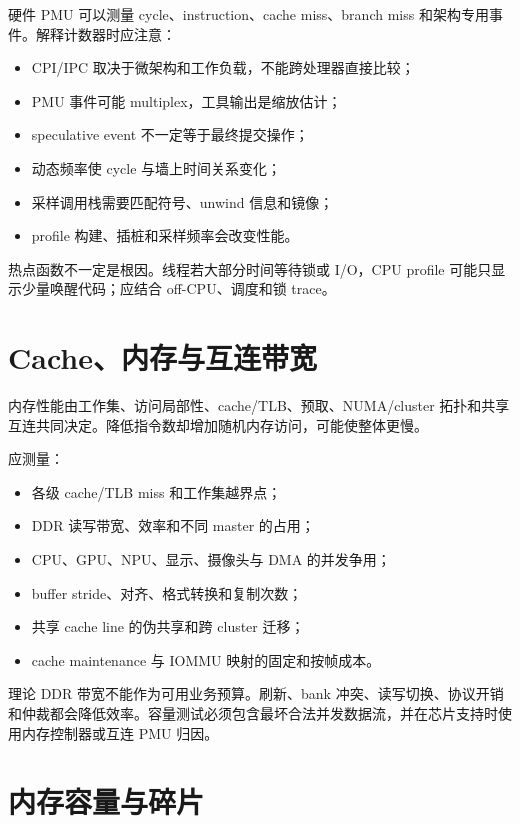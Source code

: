 硬件 PMU 可以测量 cycle、instruction、cache miss、branch miss 和架构专用事件。解释计数器时应注意：

\begin{itemize}
  \item CPI/IPC 取决于微架构和工作负载，不能跨处理器直接比较；
  \item PMU 事件可能 multiplex，工具输出是缩放估计；
  \item speculative event 不一定等于最终提交操作；
  \item 动态频率使 cycle 与墙上时间关系变化；
  \item 采样调用栈需要匹配符号、unwind 信息和镜像；
  \item profile 构建、插桩和采样频率会改变性能。
\end{itemize}

热点函数不一定是根因。线程若大部分时间等待锁或 I/O，CPU profile 可能只显示少量唤醒代码；应结合 off-CPU、调度和锁 trace。

\section{Cache、内存与互连带宽}

内存性能由工作集、访问局部性、cache/TLB、预取、NUMA/cluster 拓扑和共享互连共同决定。降低指令数却增加随机内存访问，可能使整体更慢。

应测量：

\begin{itemize}
  \item 各级 cache/TLB miss 和工作集越界点；
  \item DDR 读写带宽、效率和不同 master 的占用；
  \item CPU、GPU、NPU、显示、摄像头与 DMA 的并发争用；
  \item buffer stride、对齐、格式转换和复制次数；
  \item 共享 cache line 的伪共享和跨 cluster 迁移；
  \item cache maintenance 与 IOMMU 映射的固定和按帧成本。
\end{itemize}

理论 DDR 带宽不能作为可用业务预算。刷新、bank 冲突、读写切换、协议开销和仲裁都会降低效率。容量测试必须包含最坏合法并发数据流，并在芯片支持时使用内存控制器或互连 PMU 归因。

\section{内存容量与碎片}

